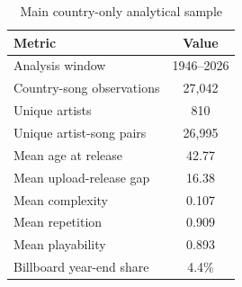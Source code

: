 \begin{table}[H]
\centering
\caption{Main country-only analytical sample}
\label{tab:sample}
\begin{tabular}{lc}
\toprule
Metric & Value \\
\midrule
Analysis window & 1946--2026 \\
Country-song observations & 27,042 \\
Unique artists & 810 \\
Unique artist-song pairs & 26,995 \\
Mean age at release & 42.77 \\
Mean upload-release gap & 16.38 \\
Mean complexity & 0.107 \\
Mean repetition & 0.909 \\
Mean playability & 0.893 \\
Billboard year-end share & 4.4\% \\
\bottomrule
\end{tabular}
\end{table}
